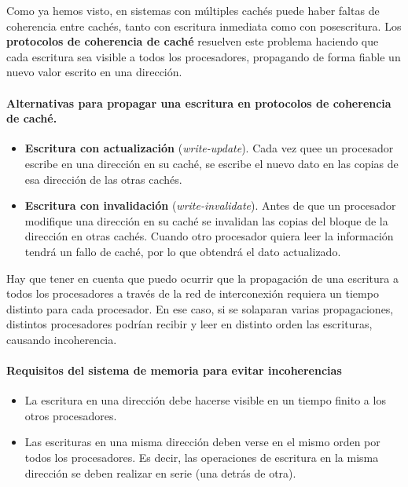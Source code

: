 \documentclass[12pt,spanish]{article}
\begin{document}
Como ya hemos visto, en sistemas con múltiples cachés puede haber faltas de coherencia entre cachés, tanto con escritura inmediata como con posescritura. Los \textbf{protocolos de coherencia de caché} resuelven este problema haciendo que cada escritura sea visible a todos los procesadores, propagando de forma fiable un nuevo valor escrito en una dirección.

\paragraph{Alternativas para propagar una escritura en protocolos de coherencia de caché.}

\begin{itemize}
	\item \textbf{Escritura con actualización} (\textit{write-update}). Cada vez quee un procesador escribe en una dirección en su caché, se escribe el nuevo dato en las copias de esa dirección de las otras cachés.
	\item \textbf{Escritura con invalidación} (\textit{write-invalidate}). Antes de que un procesador modifique una dirección en su caché se invalidan las copias del bloque de la dirección en otras cachés. Cuando otro procesador quiera leer la información tendrá un fallo de caché, por lo que obtendrá el dato actualizado.
\end{itemize}

Hay que tener en cuenta que puedo ocurrir que la propagación de una escritura a todos los procesadores a través de la red de interconexión requiera un tiempo distinto para cada procesador. En ese caso, si se solaparan varias propagaciones, distintos procesadores podrían recibir y leer en distinto orden las escrituras, causando incoherencia.

\paragraph{Requisitos del sistema de memoria para evitar incoherencias}

\begin{itemize}
	\item La escritura en una dirección debe hacerse visible en un tiempo finito a los otros procesadores.
	\item Las escrituras en una misma dirección deben verse en el mismo orden por todos los procesadores. Es decir, las operaciones de escritura en la misma dirección se deben realizar en serie (una detrás de otra).
\end{itemize}
\end{document}
